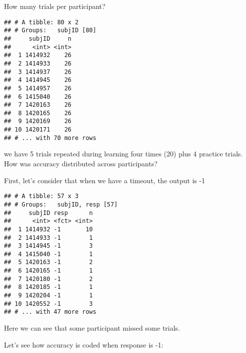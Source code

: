 \documentclass[
]{article}
\newenvironment{Shaded}{\begin{snugshade}}{\end{snugshade}}
\newcommand{\DecValTok}[1]{\textcolor[rgb]{0.00,0.00,0.81}{#1}}
\newcommand{\KeywordTok}[1]{\textcolor[rgb]{0.13,0.29,0.53}{\textbf{#1}}}
\newcommand{\NormalTok}[1]{#1}
\newcommand{\OperatorTok}[1]{\textcolor[rgb]{0.81,0.36,0.00}{\textbf{#1}}}
\newcommand{\StringTok}[1]{\textcolor[rgb]{0.31,0.60,0.02}{#1}}
\begin{document}
How many trials per participant?

\begin{Shaded}
\end{Shaded}

\begin{verbatim}
## # A tibble: 80 x 2
## # Groups:   subjID [80]
##     subjID     n
##      <int> <int>
##  1 1414932    26
##  2 1414933    26
##  3 1414937    26
##  4 1414945    26
##  5 1414957    26
##  6 1415040    26
##  7 1420163    26
##  8 1420165    26
##  9 1420169    26
## 10 1420171    26
## # ... with 70 more rows
\end{verbatim}

we have 5 trials repeated during learning four times (20) plus 4
practice trials. How was accuracy distributed across participants?

First, let's consider that when we have a timeout, the output is -1

\begin{Shaded}
\end{Shaded}

\begin{verbatim}
## # A tibble: 57 x 3
## # Groups:   subjID, resp [57]
##     subjID resp      n
##      <int> <fct> <int>
##  1 1414932 -1       10
##  2 1414933 -1        1
##  3 1414945 -1        3
##  4 1415040 -1        1
##  5 1420163 -1        2
##  6 1420165 -1        1
##  7 1420180 -1        2
##  8 1420185 -1        1
##  9 1420204 -1        1
## 10 1420552 -1        3
## # ... with 47 more rows
\end{verbatim}

Here we can see that some participant missed some trials.

Let's see how accuracy is coded when response is -1:
\end{document}
